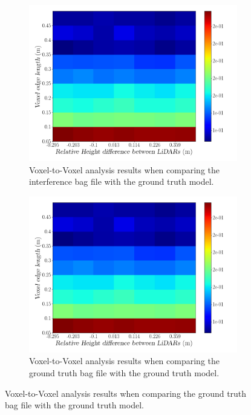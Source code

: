 \begin{figure}[!ht]
\centering
\begin{subfigure}[c]{0.45\textwidth}
	\includegraphics[width=\textwidth]{img/lidar-interference/height/octree_interference_color_mesh.png}
	\caption{Voxel-to-Voxel analysis results when comparing the interference bag file with the ground truth model.}
	\label{fig:height:octree-interference-color-mesh}
\end{subfigure}
\qquad
\begin{subfigure}[c]{0.45\textwidth}
	\includegraphics[width=\textwidth]{img/lidar-interference/height/octree_ground_truth_color_mesh.png}
	\caption{Voxel-to-Voxel analysis results when comparing the ground truth bag file with the ground truth model.}

\end{subfigure}
\end{figure}
